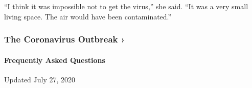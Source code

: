 ``I think it was impossible not to get the virus,'' she said. ``It was a
very small living space. The air would have been contaminated.''

\href{https://www.nytimes.com/news-event/coronavirus?action=click\&pgtype=Article\&state=default\&region=MAIN_CONTENT_3\&context=storylines_faq}{}

\hypertarget{the-coronavirus-outbreak-}{%
\subsubsection{The Coronavirus Outbreak
›}\label{the-coronavirus-outbreak-}}

\hypertarget{frequently-asked-questions}{%
\paragraph{Frequently Asked
Questions}\label{frequently-asked-questions}}

Updated July 27, 2020

